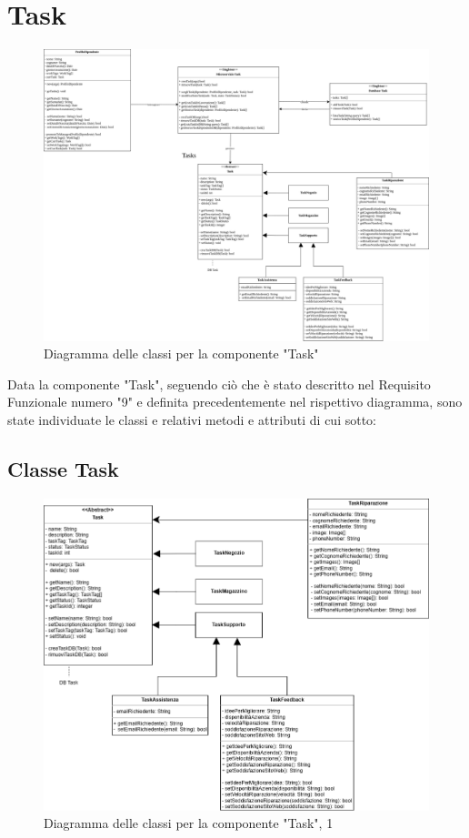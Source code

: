 \documentclass{report}
\begin{document}
\section{Task}

\begin{figure}[H]
	\centering\includegraphics[width=1\textwidth]{images/Diagramma_delle_classi_task.png}
	Diagramma delle classi per la componente "Task"
\end{figure}
Data la componente "Task", seguendo ciò che è stato descritto nel Requisito Funzionale numero "9" e definita precedentemente nel rispettivo diagramma, sono state individuate le classi e relativi metodi e attributi di cui sotto:
\subsection*{Classe Task}
\begin{figure}[H]
	\centering\includegraphics[width=1\textwidth]{images/Diagramma_delle_classi_task1.png}
	Diagramma delle classi per la componente "Task", 1
\end{figure}
\end{document}
